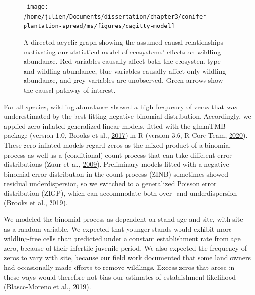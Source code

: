\documentclass[
]{article}
\begin{document}
\begin{figure}
\texttt{[image: /home/julien/Documents/dissertation/chapter3/conifer-plantation-spread/ms/figures/dagitty-model]} \caption{A directed acyclic graph showing the assumed causal relationships motivating our statistical model of ecosystems' effects on wildling abundance. Red variables causally affect both the ecosystem type and wildling abundance, blue variables causally affect only wildling abundance, and grey variables are unobserved. Green arrows show the causal pathway of interest.}\label{fig:DAG}
\end{figure}

For all species, wildling abundance showed a high frequency of zeros that was underestimated by the best fitting negative binomial distribution.
Accordingly, we applied zero-inflated generalized linear models, fitted with the glmmTMB package (version 1.0, Brooks et al., \protect\hyperlink{ref-brooksGlmmTMBBalancesSpeed2017}{2017}) in R (version 3.6, R Core Team, \protect\hyperlink{ref-rcoreteamLanguageEnvironmentStatistical2020}{2020}).
These zero-inflated models regard zeros as the mixed product of a binomial process as well as a (conditional) count process that can take different error distributions (Zuur et al., \protect\hyperlink{ref-zuurMixedEffectsModels2009}{2009}).
Preliminary models fitted with a negative binomial error distribution in the count process (ZINB) sometimes showed residual underdispersion, so we switched to a generalized Poisson error distribution (ZIGP), which can accommodate both over- and underdispersion (Brooks et al., \protect\hyperlink{ref-brooksStatisticalModelingPatterns2019}{2019}).

We modeled the binomial process as dependent on stand age and site, with site as a random variable.
We expected that younger stands would exhibit more wildling-free cells than predicted under a constant establishment rate from age zero, because of their infertile juvenile period.
We also expected the frequency of zeros to vary with site, because our field work documented that some land owners had occasionally made efforts to remove wildlings.
Excess zeros that arose in these ways would therefore not bias our estimates of establishment likelihood (Blasco-Moreno et al., \protect\hyperlink{ref-blasco-morenoWhatDoesZero2019}{2019}).
\end{document}
